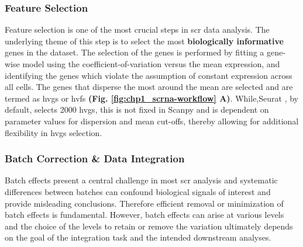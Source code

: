 \subsubsection{Feature Selection}
\par Feature selection is one of the most crucial steps in \gls{scr} data analysis. The underlying theme of this step is to select the most \textbf{biologically informative} genes in the dataset. The selection of the genes is performed by fitting a gene-wise model using the coefficient-of-variation versus the mean expression, and identifying the genes which violate the assumption of constant expression across all cells. The genes that disperse the most around the mean are selected and are termed as \glspl{hvg} or \glspl{hvf} \textbf{(Fig. \ref{fig:chp1_scrna-workflow} A)}. %
While,Seurat \textbf{\cite{butler_integrating_2018,stuart_comprehensive_2019,hao_integrated_2021}}, by default, selects 2000 \glspl{hvg}, this is not fixed in Scanpy \textbf{\cite{wolf_scanpy_2018}} and is dependent on parameter values for dispersion and mean cut-offs, thereby allowing for additional flexibility in \glspl{hvg} selection.

\subsubsection{Batch Correction \& Data Integration}

\par Batch effects present a central challenge in most \gls{scr} analysis and systematic differences between batches can confound biological signals of interest and provide misleading conclusions. Therefore
efficient removal or minimization of batch effects is fundamental. However, batch effects can arise at various levels and the choice of the levels to retain or remove the variation ultimately depends on the goal of the integration task and the intended downstream analyses.\\

